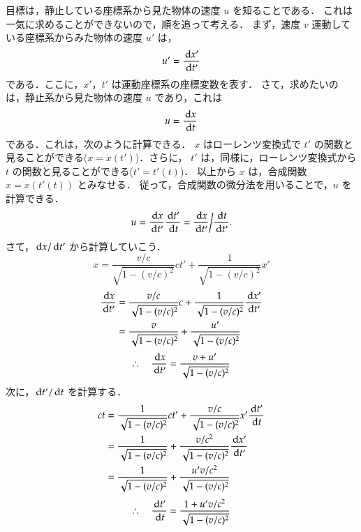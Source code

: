     目標は，静止している座標系から見た物体の速度 $u$ を知ることである．
    これは一気に求めることができないので，順を追って考える．
    まず，速度 $v$ 運動している座標系からみた物体の速度 $u'$ は，
        \begin{align}
            u' = \frac{\,\mathrm{d} x'}{\,\mathrm{d} t'}
        \end{align}
    である．ここに，$x'$，$t'$ は運動座標系の座標変数を表す．
    さて，求めたいのは，静止系から見た物体の速度 $u$ であり，これは
        \begin{equation*}
            u= \frac{\,\mathrm{d} x}{\,\mathrm{d} t}
        \end{equation*}
    である．これは，次のように計算できる．
    $x$ はローレンツ変換式で $t'$ の関数と見ることができる($x=x(t')$)．さらに，
    $t'$ は，同様に，ローレンツ変換式から $t$ の関数と見ることができる($t'=t'(t)$)．
    以上から $x$ は，合成関数 $x=x\left( t'(t) \right)$ とみなせる．
    従って，合成関数の微分法を用いることで，$u$ を計算できる．
        \begin{align}
        u=\frac{\,\mathrm{d} x}{\,\mathrm{d} t'}\frac{\,\mathrm{d} t'}{\,\mathrm{d} t}=\frac{\,\mathrm{d} x}{\,\mathrm{d} t'}\bigg/ \frac{\,\mathrm{d} t}{\,\mathrm{d} t'}.
        \end{align}
    さて，$\,\mathrm{d} x/\,\mathrm{d} t'$ から計算していこう．
        \begin{equation*}
            x=\frac{v/c}{\sqrt{ 1-(v/c)^{2} }}ct'+\frac{1}{\sqrt{ 1-(v/c)^{2} }} x'
        \end{equation*}
        \begin{align*}
        \frac{\,\mathrm{d} x}{\,\mathrm{d} t'}&=\frac{v/c}{\sqrt{ 1-(v/c)^{2} }}c+\frac{1}{\sqrt{ 1-(v/c)^{2} }} \frac{\,\mathrm{d} x'}{\,\mathrm{d} t'} \\
            &=\frac{v}{\sqrt{ 1-(v/c)^{2} }}+\frac{u'}{\sqrt{ 1-(v/c)^{2} }}
        \end{align*}
    \begin{align}
        \therefore\quad\frac{\,\mathrm{d} x}{\,\mathrm{d} t'}=\frac{v+u'}{\sqrt{ 1-(v/c)^{2} }}
    \end{align}
    次に，$\,\mathrm{d} t'/ \,\mathrm{d} t$ を計算する．
        \begin{align*}
            ct&=\frac{1}{\sqrt{ 1-(v/c)^{2} }} ct' +\frac{v/c}{\sqrt{ 1-(v/c)^{2} }} x' \frac{\,\mathrm{d} t'}{\,\mathrm{d} t} \\
            &=\frac{1}{\sqrt{ 1-(v/c)^{2} }} +\frac{v/{c}^{2}}{\sqrt{ 1-(v/c)^{2} }} \frac{\,\mathrm{d} x'}{\,\mathrm{d} t'} \\
            &=\frac{1}{\sqrt{ 1-(v/c)^{2} }}+\frac{u'v/{c}^{2}}{\sqrt{ 1-(v/c)^{2} }}
        \end{align*}
    \begin{align}
    \therefore\quad\frac{\,\mathrm{d} t'}{\,\mathrm{d} t}=\frac{1+u'v/{c}^{2}}{\sqrt{ 1-(v/c)^{2} }}
    \end{align}
